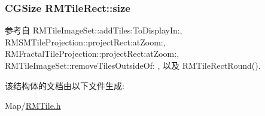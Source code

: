 \hypertarget{struct_r_m_tile_rect_a94e1d6f03e6a83a121c4b577499a925c}{
\subsubsection[{size}]{\setlength{\rightskip}{0pt plus 5cm}C\-G\-Size R\-M\-Tile\-Rect\-::size}}\label{struct_r_m_tile_rect_a94e1d6f03e6a83a121c4b577499a925c}


参考自 R\-M\-Tile\-Image\-Set\-::add\-Tiles\-:\-To\-Display\-In\-:, R\-M\-S\-M\-Tile\-Projection\-::project\-Rect\-:at\-Zoom\-:, R\-M\-Fractal\-Tile\-Projection\-::project\-Rect\-:at\-Zoom\-:, R\-M\-Tile\-Image\-Set\-::remove\-Tiles\-Outside\-Of\-: , 以及 R\-M\-Tile\-Rect\-Round().



该结构体的文档由以下文件生成\-:\begin{DoxyCompactItemize}
\item 
Map/\hyperlink{_r_m_tile_8h}{R\-M\-Tile.\-h}\end{DoxyCompactItemize}
